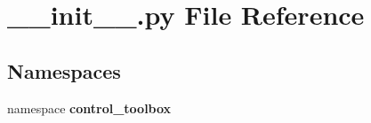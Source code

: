 \section{\-\_\-\-\_\-init\-\_\-\-\_\-.\-py \-File \-Reference}
\label{____init_____8py}
\subsection*{\-Namespaces}
\begin{DoxyCompactItemize}
\item 
namespace {\bf control\-\_\-toolbox}
\end{DoxyCompactItemize}
